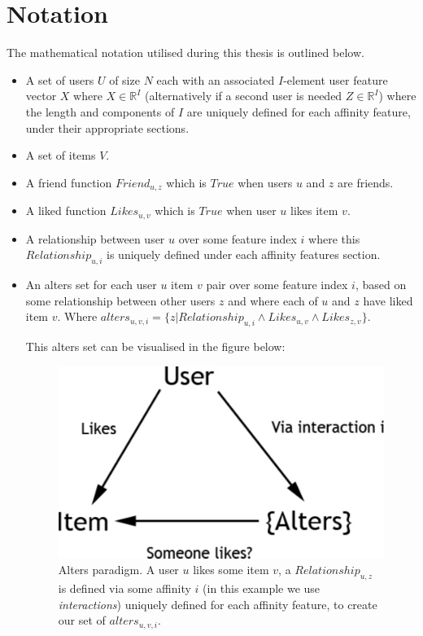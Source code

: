 \section{Notation}
\label{sec:notation}

The mathematical notation utilised during this thesis is outlined below.

\begin{itemize}
\item A set of users $U$ of size $N$ each with an associated $I$-element user feature vector $X$ where $X \in \mathbb{R}^I$ (alternatively if a second user is needed $Z \in \mathbb{R}^I$) 
where the length and components of $I$ are uniquely defined for each affinity feature, under their appropriate sections.
\item A set of items $V$.
\item A friend function $Friend_{u,z}$ which is $True$ when users $u$ and $z$ are friends.
\item A liked function $Likes_{u,v}$ which is $True$ when user $u$ likes item $v$.
\item A relationship between user $u$ over some feature index $i$ where this $Relationship_{u,i}$ is uniquely defined under each affinity features section.
\item An alters set for each user $u$ item $v$ pair over some feature index $i$, based on some relationship between other users $z$ and where each of $u$ and $z$ have liked item $v$. 
Where $alters_{u,v,i} = \{z | Relationship_{u,i} \wedge Likes_{u,v} \wedge Likes_{z,v}\}$.

This alters set can be visualised in the figure below:

\begin{figure}[h!]
	\begin{center}
		\includegraphics[scale=0.5]{imgs/alters.pdf}
		\caption{Alters paradigm. A user $u$ likes some item $v$, a $Relationship_{u,z}$ is defined via some affinity $i$ (in this example we use \emph{interactions}) uniquely defined
		for each affinity feature, to create our set of $alters_{u,v,i}$.}
	\end{center}
\end{figure}


\end{itemize}
